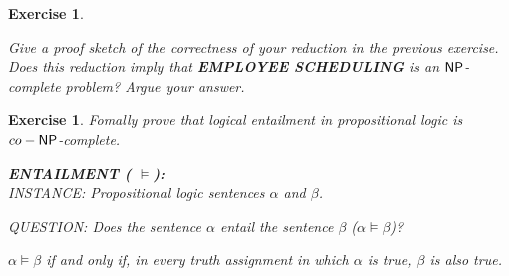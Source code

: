 \documentclass [11pt]{article}
\newtheorem{exercise}[theorem]{Exercise}
\newcommand{\ccfont}[1]{\protect\mathsf{#1}}
\newcommand{\NP}{\ccfont{NP}}
\newcommand{\solution}[1]{\noindent {\bf Solution.}  #1}
\begin{document}


\begin{exercise}

  \label{ex:Scheduling2}

  Give a proof sketch of the correctness of your reduction in the previous exercise. Does this reduction imply that \textbf{EMPLOYEE SCHEDULING} is an $\NP$-complete problem? Argue your answer.  
   
\end{exercise}





\begin{exercise}
  \label{ex:CO-NP}
Fomally prove that logical entailment in propositional logic is $co-\NP$-complete. 
 
\medskip   
\noindent 
\textbf{ENTAILMENT ( $\models$):} \\
\noindent 
INSTANCE: Propositional logic sentences $\alpha$ and $\beta$. 

\noindent 
QUESTION: Does the sentence $\alpha$ entail the sentence $\beta$  ($\alpha \models \beta$)? 

\medskip

\noindent $\alpha \models \beta$ if and only if, in every truth assignment in which $\alpha$ is true, $\beta$ is also true.    

  
  
\end{exercise}
\end{document}

